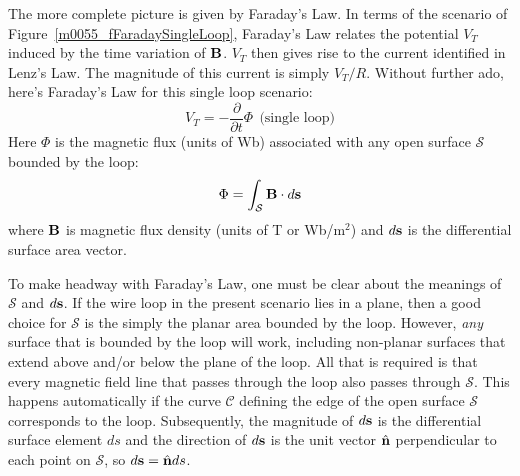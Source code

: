 The more complete picture is given by Faraday's Law.
In terms of the scenario of Figure~\ref{m0055_fFaradaySingleLoop}, Faraday's Law relates the potential $V_T$ induced by the time variation of ${\bf B}$. 
$V_T$ then gives rise to the current identified in Lenz's Law. 
The magnitude of this current is simply $V_T/R$. %
Without further ado, here's Faraday's Law for this single loop scenario:
%
\begin{equation}   
V_T = - \frac{\partial}{\partial t} \Phi ~~\mbox{(single loop)}
\label{m0055_eVT}
\end{equation}
%
Here $\Phi$ is the magnetic flux (units of Wb) associated with any open surface $\mathcal{S}$ bounded by the loop:
%
\begin{equation}   
\Phi = \int_{\mathcal{S}} { {\bf B} \cdot d{\bf s} }
\label{m0055_ePhi}
\end{equation}
%
where ${\bf B}$ is magnetic flux density (units of T or Wb/m$^2$) and $d{\bf s}$ is the differential surface area vector.

To make headway with Faraday's Law, one must be clear about the meanings of $\mathcal{S}$ and $d{\bf s}$.
If the wire loop in the present scenario lies in a plane, then a good choice for $\mathcal{S}$ is the simply the planar area bounded by the loop.
However, \emph{any} surface that is bounded by the loop will work, including non-planar surfaces that extend above and/or below the plane of the loop. All that is required is that every magnetic field line that passes through the loop also passes through $\mathcal{S}$. 
This happens automatically if the curve $\mathcal{C}$ defining the edge of the open surface $\mathcal{S}$ corresponds to the loop.
Subsequently, the magnitude of $d{\bf s}$ is the differential surface element $ds$ and the direction of $d{\bf s}$ is the unit vector $\hat{\bf n}$ perpendicular to each point on $\mathcal{S}$, so $d{\bf s}=\hat{\bf n}ds$.

